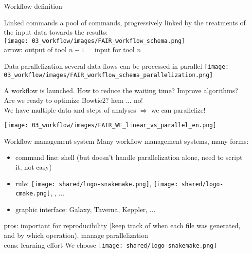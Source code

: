 \begin{frame}{Workflow definition}
\begin{block}{Linked commands}
 a pool of commands, progressively linked by the treatments of the input data towards the results:\\
    \texttt{[image: 03\_workflow/images/FAIR\_workflow\_schema.png]}\\
   arrow: output of tool $n-1$ = input for tool $n$
\end{block}
\begin{block}{Data parallelization}
     several data flows can be processed in parallel \texttt{[image: 03\_workflow/images/FAIR\_workflow\_schema\_parallelization.png]}
\end{block}
\end{frame}
\begin{frame}{A workflow is launched. How to reduce the waiting time?}
    Improve algorithms? Are we ready to optimize Bowtie2? hem ... no!\\
    We have multiple data and steps of analyses $\Rightarrow$ we can parallelize!\\
    \begin{center}
            \texttt{[image: 03\_workflow/images/FAIR\_WF\_linear\_vs\_parallel\_en.png]}
    \end{center}
\end{frame}
\begin{frame}{Workflow management system}
Many workflow management systems, many forms:
\begin{itemize}
    \item command line: shell (but doesn't handle parallelization alone, need to script it, not easy)
    \item rule: \texttt{[image: shared/logo-snakemake.png]}, \texttt{[image: shared/logo-cmake.png]}, \logoNextflow, ...
    \item graphic interface: Galaxy, Taverna, Keppler, ...
\end{itemize}
\vfill
pros: important for reproducibility (keep track of when each file was generated, and by which operation), manage parallelization\\
cons: learning effort
\vfill
We choose \texttt{[image: shared/logo-snakemake.png]}
\end{frame}
